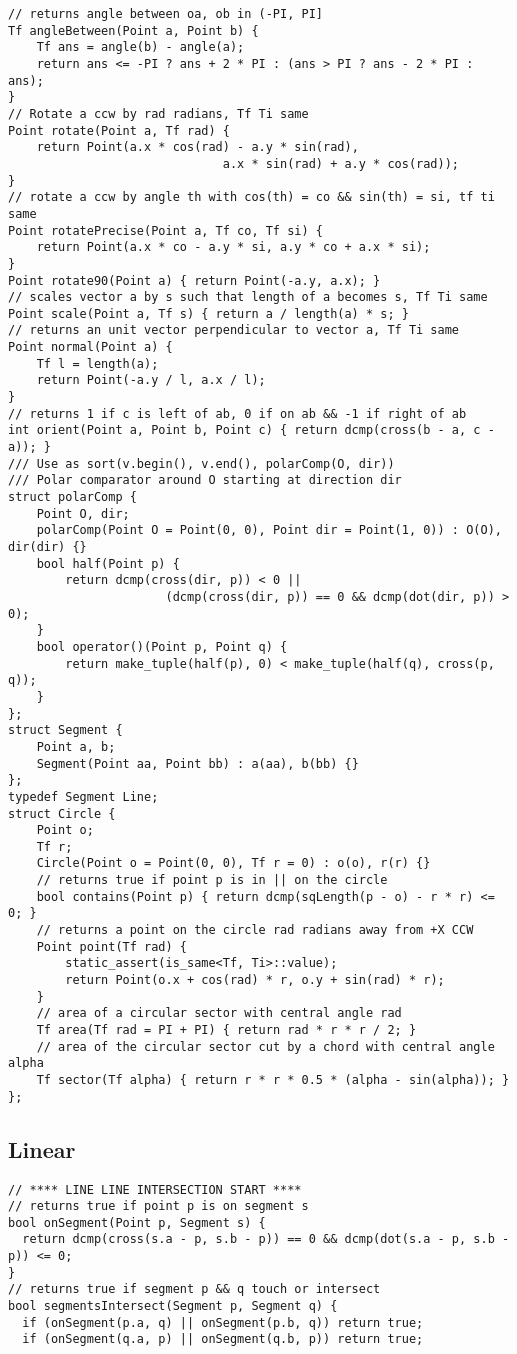 \documentclass[FSZ,a4paper,onesided]{article}
\begin{document}
\begin{multicols*}{\COLS}
\begin{lstlisting}
// returns angle between oa, ob in (-PI, PI]
Tf angleBetween(Point a, Point b) {
    Tf ans = angle(b) - angle(a);
    return ans <= -PI ? ans + 2 * PI : (ans > PI ? ans - 2 * PI : ans);
}
// Rotate a ccw by rad radians, Tf Ti same
Point rotate(Point a, Tf rad) {
    return Point(a.x * cos(rad) - a.y * sin(rad),
                              a.x * sin(rad) + a.y * cos(rad));
}
// rotate a ccw by angle th with cos(th) = co && sin(th) = si, tf ti same
Point rotatePrecise(Point a, Tf co, Tf si) {
    return Point(a.x * co - a.y * si, a.y * co + a.x * si);
}
Point rotate90(Point a) { return Point(-a.y, a.x); }
// scales vector a by s such that length of a becomes s, Tf Ti same
Point scale(Point a, Tf s) { return a / length(a) * s; }
// returns an unit vector perpendicular to vector a, Tf Ti same
Point normal(Point a) {
    Tf l = length(a);
    return Point(-a.y / l, a.x / l);
}
// returns 1 if c is left of ab, 0 if on ab && -1 if right of ab
int orient(Point a, Point b, Point c) { return dcmp(cross(b - a, c - a)); }
/// Use as sort(v.begin(), v.end(), polarComp(O, dir))
/// Polar comparator around O starting at direction dir
struct polarComp {
    Point O, dir;
    polarComp(Point O = Point(0, 0), Point dir = Point(1, 0)) : O(O), dir(dir) {}
    bool half(Point p) {
        return dcmp(cross(dir, p)) < 0 ||
                      (dcmp(cross(dir, p)) == 0 && dcmp(dot(dir, p)) > 0);
    }
    bool operator()(Point p, Point q) {
        return make_tuple(half(p), 0) < make_tuple(half(q), cross(p, q));
    }
};
struct Segment {
    Point a, b;
    Segment(Point aa, Point bb) : a(aa), b(bb) {}
};
typedef Segment Line;
struct Circle {
    Point o;
    Tf r;
    Circle(Point o = Point(0, 0), Tf r = 0) : o(o), r(r) {}
    // returns true if point p is in || on the circle
    bool contains(Point p) { return dcmp(sqLength(p - o) - r * r) <= 0; }
    // returns a point on the circle rad radians away from +X CCW
    Point point(Tf rad) {
        static_assert(is_same<Tf, Ti>::value);
        return Point(o.x + cos(rad) * r, o.y + sin(rad) * r);
    }
    // area of a circular sector with central angle rad
    Tf area(Tf rad = PI + PI) { return rad * r * r / 2; }
    // area of the circular sector cut by a chord with central angle alpha
    Tf sector(Tf alpha) { return r * r * 0.5 * (alpha - sin(alpha)); }
};
\end{lstlisting}
\subsection{Linear}
\begin{lstlisting}
// **** LINE LINE INTERSECTION START ****
// returns true if point p is on segment s
bool onSegment(Point p, Segment s) {
  return dcmp(cross(s.a - p, s.b - p)) == 0 && dcmp(dot(s.a - p, s.b - p)) <= 0;
}
// returns true if segment p && q touch or intersect
bool segmentsIntersect(Segment p, Segment q) {
  if (onSegment(p.a, q) || onSegment(p.b, q)) return true;
  if (onSegment(q.a, p) || onSegment(q.b, p)) return true;


\end{lstlisting}
\end{multicols*}
\end{document}

